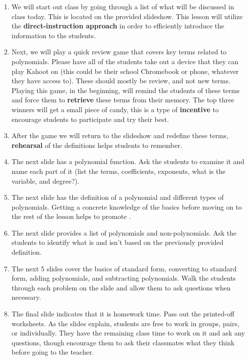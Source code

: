 \begin{enumerate}
    \item We will start out class by going through a list of what will be discussed in class today. This is located on the provided slideshow. This lesson will utilize the \textbf{direct-instruction approach} in order to efficiently introduce the information to the students.
    \newpage

    \item Next, we will play a quick review game that covers key terms related to polynomials. Please have all of the students take out a device that they can play Kahoot on (this could be their school Chromebook or phone, whatever they have access to). These should mostly be review, and not new terms. Playing this game, in the beginning, will remind the students of these terms and force them to \textbf{retrieve} these terms from their memory. The top three winners will get a small piece of candy, this is a type of \textbf{incentive} to encourage students to participate and try their best.
    \item After the game we will return to the slideshow and redefine these terms, \textbf{rehearsal} of the definitions helps students to remember. 
    \item The next slide has a polynomial function. Ask the students to examine it and name each part of it (list the terms, coefficients, exponents, what is the variable, and degree?).
    \item The next slide has the definition of a polynomial and different types of polynomials. Getting a concrete knowledge of the basics before moving on to the rest of the lesson helps to promote .
    \item The next slide provides a list of polynomials and non-polynomials. Ask the students to identify what is and isn't based on the previously provided definition.
    \item The next 5 slides cover the basics of standard form, converting to standard form, adding polynomials, and subtracting polynomials. Walk the students through each problem on the slide and allow them to ask questions when necessary.
    \item The final slide indicates that it is homework time. Pass out the printed-off worksheets. As the slides explain, students are free to work in groups, pairs, or individually. They have the remaining class time to work on it and ask any questions, though encourage them to ask their classmates what they think before going to the teacher.
\end{enumerate}